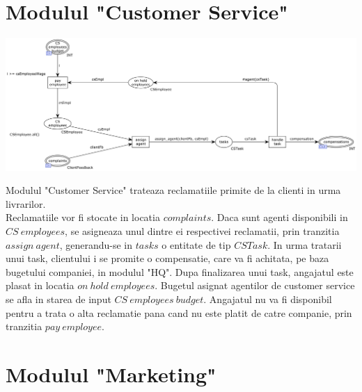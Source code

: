 \begin{spacing}{1.5}
\section{Modulul "Customer Service"}

\includegraphics[width=\textwidth]{./Parts/Chapter1/CustomerService.png}

Modulul "Customer Service" trateaza reclamatiile primite de la clienti in urma livrarilor.\\
Reclamatiile vor fi stocate in locatia $complaints$. Daca sunt agenti disponibili in $CS\ employees$,
se asigneaza unul dintre ei respectivei reclamatii, prin tranzitia $assign\ agent$, generandu-se in $tasks$
o entitate de tip $CSTask$. In urma tratarii unui task, clientului i se promite o compensatie, care va fi
achitata, pe baza bugetului companiei, in modulul "HQ". Dupa finalizarea unui task, angajatul este plasat
in locatia $on\ hold\ employees$. Bugetul asignat agentilor de customer service se afla in starea de input
$CS\ employees\ budget$. Angajatul nu va fi disponibil pentru a trata o alta reclamatie pana cand nu este
platit de catre companie, prin tranzitia $pay\ employee$.

\section{Modulul "Marketing"}


\end{spacing}

